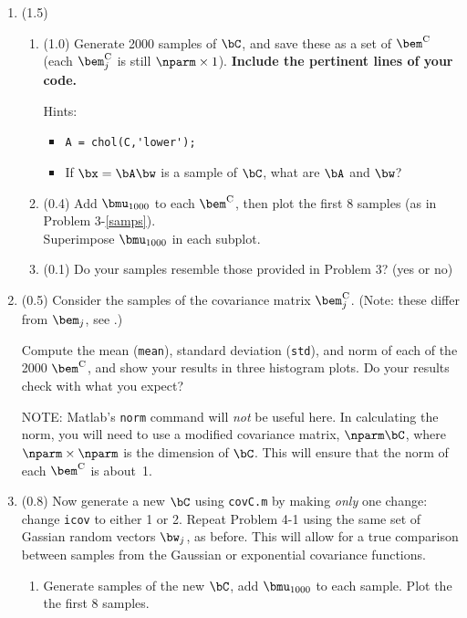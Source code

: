 \documentclass[11pt,titlepage,fleqn]{article}
\begin{document}
\begin{enumerate}
\item (1.5) 

\begin{enumerate}
\item (1.0) Generate 2000 samples of $\bC$, and save these as a set of $\bem^{\rm C}$ (each $\bem_j^{\rm C}$ is still $\nparm \times 1$). {\bf Include the pertinent lines of your code.}

Hints:
%
\begin{itemize}
\item \verb+A = chol(C,'lower');+
\item If $\bx = \bA\bw$ is a sample of $\bC$, what are $\bA$ and $\bw$?
\end{itemize}

\item (0.4) Add $\bmu_{1000}$ to each $\bem^{\rm C}$, then plot the first 8 samples (as in Problem 3-\ref{samps}). \\
Superimpose $\bmu_{1000}$ in each subplot.

\item (0.1) Do your samples resemble those provided in Problem 3? (yes or no)
\end{enumerate}


\item (0.5) Consider the samples of the covariance matrix $\bem_j^{\rm C}$. (Note: these differ from $\bem_j$, see .)

Compute the mean (\verb+mean+), standard deviation (\verb+std+), and norm of each of the 2000 $\bem^{\rm C}$, and show your results in three histogram plots. Do your results check with what you expect?

NOTE: Matlab's \verb+norm+ command will {\em not} be useful here. In calculating the norm, you will need to use a modified covariance matrix, $\nparm\bC$, where $\nparm\times\nparm$ is the dimension of $\bC$. This will ensure that the norm of each $\bem^{\rm C}$ is about~1.


\item (0.8) Now generate a new $\bC$ using \verb+covC.m+ by making {\em only} one change: change \verb+icov+ to either 1 or 2. Repeat Problem 4-1 using the same set of Gassian random vectors $\bw_j$, as before. This will allow for a true comparison between samples from the Gaussian or exponential covariance functions.

\begin{enumerate}
\item Generate samples of the new $\bC$, add $\bmu_{1000}$ to each sample. Plot the the first 8 samples.


\end{enumerate}
\end{enumerate}
\end{document}
